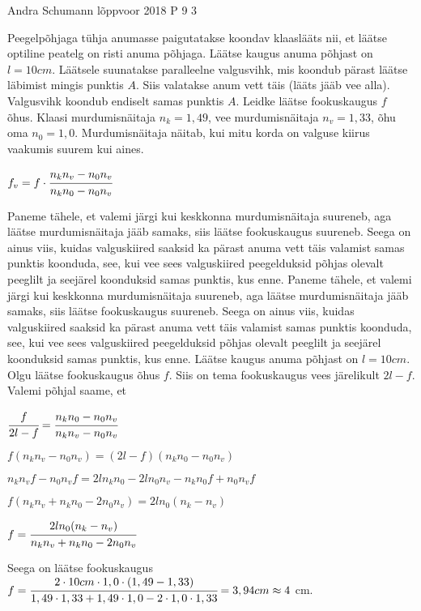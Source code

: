 {Andra Schumann} %
{lõppvoor} %
{2018} %
{P 9} %
{3} %
{
\ifStatement
Peegelpõhjaga tühja anumasse paigutatakse koondav klaaslääts nii, et läätse optiline peatelg on risti anuma põhjaga. Läätse kaugus anuma põhjast on $l = 10 cm$. Läätsele suunatakse paralleelne valgusvihk, mis koondub pärast läätse läbimist mingis punktis $A$. Siis valatakse anum vett täis (lääts jääb vee alla). Valgusvihk koondub endiselt samas punktis $A$. Leidke läätse fookuskaugus $f$ õhus. Klaasi murdumisnäitaja $n_k = 1,49$, vee murdumisnäitaja $n_v = 1,33$, õhu oma $n_0 = 1,0$. Murdumisnäitaja näitab, kui mitu korda on valguse kiirus vaakumis suurem kui aines.
\begin{center}
$f_v = f \cdot \cfrac{n_k n_v - n_0 n_v}{n_k n_0 - n_0 n_v}$
\end{center}
\fi
\ifHint
Paneme tähele, et valemi järgi kui keskkonna murdumisnäitaja suureneb, aga läätse murdumisnäitaja jääb samaks, siis läätse fookuskaugus suureneb. Seega on ainus viis, kuidas valguskiired saaksid ka pärast anuma vett täis valamist samas punktis koonduda, see, kui vee sees valguskiired peegelduksid põhjas olevalt peeglilt ja seejärel koonduksid samas punktis, kus enne.
\fi
\ifSolution
Paneme tähele, et valemi järgi kui keskkonna murdumisnäitaja suureneb, aga läätse murdumisnäitaja jääb samaks, siis läätse fookuskaugus suureneb. Seega on ainus viis, kuidas valguskiired saaksid ka pärast anuma vett täis valamist samas punktis koonduda, see, kui vee sees valguskiired peegelduksid põhjas olevalt peeglilt ja seejärel koonduksid samas punktis, kus enne. Läätse kaugus anuma põhjast on $l = 10 cm$. Olgu läätse fookuskaugus õhus $f$. Siis on tema fookuskaugus vees järelikult $2l - f$. Valemi põhjal saame, et
\begin{center}
$\cfrac {f}{2l - f} = \cfrac {n_k n_0 - n_0 n_v}{n_k n_v - n_0 n_v} $
\end{center}
\begin{center}
$f(n_k n_v - n_0 n_v) = (2l - f)(n_k n_0 - n_0 n_v)$ 
\end{center}
\begin{center}
$n_k n_v f - n_0 n_v f = 2ln_k n_0 - 2ln_0 n_v - n_k n_0 f + n_0 n_v f$
\end{center}
\begin{center}
$f(n_k n_v + n_k n_0 - 2n_0 n_v) = 2ln_0 (n_k - n_v)$
\end{center}
\begin{center}
$f = \cfrac{2ln_0(n_k - n_v)}{n_k n_v + n_k n_0 - 2n_0 n_v}$
\end{center}
Seega on läätse fookuskaugus $f = \cfrac{ 2 \cdot 10cm \cdot 1,0 \cdot (1,49 - 1,33)}{1,49 \cdot 1,33 + 1,49 \cdot 1,0 - 2 \cdot 1,0 \cdot 1,33} = 3,94 cm \approx 4$ cm.
\fi
}